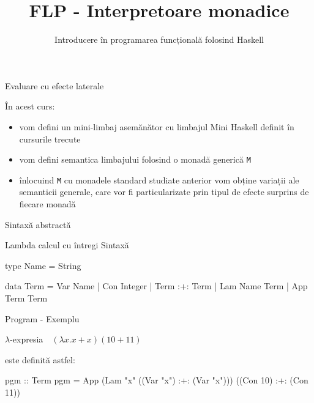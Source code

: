 \documentclass[xcolor=pdftex,romanian,colorlinks]{beamer}
\title[FLP---Interpretoare Monadice]{FLP - Interpretoare monadice}
\subtitle{Introducere în programarea funcțională folosind Haskell}
\date{}
\newcommand{\li}[1]{\lstinline$#1$}
\begin{document}
\begin{frame}
  \titlepage
\end{frame}




\begin{frame}[fragile]{Evaluare cu efecte laterale}


În acest curs:

\begin{itemize}
\item vom defini un mini-limbaj asemănător cu limbajul Mini Haskell definit în cursurile trecute

\item  vom defini semantica limbajului folosind o monadă generică \li{M}

\item  înlocuind \li{M} cu monadele standard studiate anterior vom obține variații ale semanticii generale, 
care vor fi particularizate prin tipul de efecte surprins de fiecare monadă
\end{itemize}
\end{frame}


\begin{frame}[fragile]{Sintaxă abstractă}


Lambda calcul cu întregi Sintaxă

\begin{asciihs}
type Name = String

data Term = Var Name
          | Con Integer
          | Term :+: Term
          | Lam Name Term
          | App Term Term


\end{asciihs}

\end{frame}



\begin{frame}[fragile]{Program - Exemplu}

 $\lambda$-expresia $\,\,\,\, (\lambda x. x+x)(10+11)$
 
 

este definită astfel:



\begin{asciihs}
pgm :: Term
pgm = App 
          (Lam "x" ((Var "x") :+: (Var "x")))
          ((Con 10) :+:  (Con 11))
\end{asciihs}
\end{frame}
\end{document}
